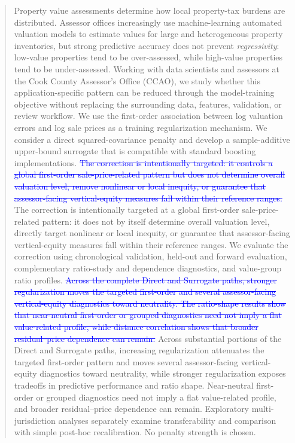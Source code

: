 \documentclass[10pt]{article}
\theoremstyle{definition}
\newcommand{\1}{\mathbf{1}}
\newcommand{\oldtext}[1]{\textcolor{blue}{\sout{#1}}}
\newcommand{\newtext}[1]{\textcolor{impGreen}{#1}}
\begin{document}
\begin{abstract}
Property value assessments determine how local property-tax burdens are distributed.
Assessor offices increasingly use machine-learning automated valuation models to
estimate values for large and heterogeneous property inventories, but strong
predictive accuracy does not prevent \emph{regressivity}: low-value properties tend to be over-assessed, while high-value properties tend to be under-assessed.
Working with data scientists and assessors at the Cook County Assessor's Office (CCAO), we study whether this application-specific pattern can be reduced through the model-training objective without replacing the surrounding data, features, validation, or review workflow. We use the first-order association between log valuation errors and log sale prices as a training regularization mechanism. We consider a direct squared-covariance penalty and develop a sample-additive upper-bound surrogate that is compatible with standard boosting implementations. \oldtext{The correction is intentionally targeted: it controls a global first-order sale-price-related pattern but does not determine overall valuation level, remove nonlinear or local inequity, or guarantee that assessor-facing vertical-equity measures fall within their reference ranges.}
\newtext{The correction is intentionally targeted at a global first-order sale-price-related pattern: it does not by itself determine overall valuation level, directly target nonlinear or local inequity, or guarantee that assessor-facing vertical-equity measures fall within their reference ranges.} We evaluate the correction using chronological validation, held-out and forward evaluation, complementary ratio-study and dependence diagnostics, and value-group ratio profiles. 
\oldtext{Across the complete Direct and Surrogate paths, stronger regularization moves the targeted first-order and several assessor-facing vertical-equity diagnostics toward neutrality. The ratio-shape results show that near-neutral first-order or grouped diagnostics need not imply a flat value-related profile, while distance correlation shows that broader residual--price dependence can remain.}
\newtext{Across substantial portions of the Direct and Surrogate paths, increasing regularization attenuates the targeted first-order pattern and moves several assessor-facing vertical-equity diagnostics toward neutrality, while stronger regularization exposes tradeoffs in predictive performance and ratio shape. Near-neutral first-order or grouped diagnostics need not imply a flat value-related profile, and broader residual--price dependence can remain.} Exploratory multi-jurisdiction analyses separately examine transferability and comparison with simple post-hoc recalibration. No penalty strength is chosen.

\end{abstract}
\end{document}
